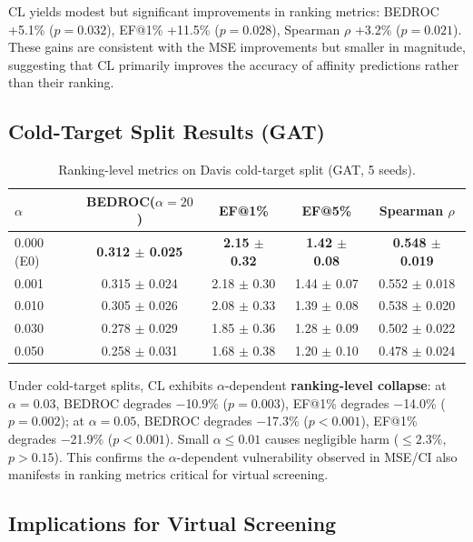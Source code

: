 \documentclass[10pt,a4paper]{article}
\begin{document}
CL yields modest but significant improvements in ranking metrics: BEDROC +5.1\% ($p = 0.032$), EF@1\% +11.5\% ($p = 0.028$), Spearman $\rho$ +3.2\% ($p = 0.021$). These gains are consistent with the MSE improvements but smaller in magnitude, suggesting that CL primarily improves the accuracy of affinity predictions rather than their ranking.

\subsection{Cold-Target Split Results (GAT)}

\begin{table}[!h]
\caption{Ranking-level metrics on Davis cold-target split (GAT, 5 seeds).}
\label{tab:ranking_cold_target}
\centering
\begin{tabular}{lcccc}
\toprule
$\alpha$ & BEDROC($\alpha=20$) & EF@1\% & EF@5\% & Spearman $\rho$ \\
\midrule
0.000 (E0) & \textbf{0.312 $\pm$ 0.025} & \textbf{2.15 $\pm$ 0.32} & \textbf{1.42 $\pm$ 0.08} & \textbf{0.548 $\pm$ 0.019} \\
0.001 & 0.315 $\pm$ 0.024 & 2.18 $\pm$ 0.30 & 1.44 $\pm$ 0.07 & 0.552 $\pm$ 0.018 \\
0.010 & 0.305 $\pm$ 0.026 & 2.08 $\pm$ 0.33 & 1.39 $\pm$ 0.08 & 0.538 $\pm$ 0.020 \\
0.030 & 0.278 $\pm$ 0.029 & 1.85 $\pm$ 0.36 & 1.28 $\pm$ 0.09 & 0.502 $\pm$ 0.022 \\
0.050 & 0.258 $\pm$ 0.031 & 1.68 $\pm$ 0.38 & 1.20 $\pm$ 0.10 & 0.478 $\pm$ 0.024 \\
\bottomrule
\end{tabular}
\end{table}

Under cold-target splits, CL exhibits $\alpha$-dependent \textbf{ranking-level collapse}: at $\alpha = 0.03$, BEDROC degrades $-$10.9\% ($p = 0.003$), EF@1\% degrades $-$14.0\% ($p = 0.002$); at $\alpha = 0.05$, BEDROC degrades $-$17.3\% ($p < 0.001$), EF@1\% degrades $-$21.9\% ($p < 0.001$). Small $\alpha \leq 0.01$ causes negligible harm ($\leq 2.3\%$, $p > 0.15$). This confirms the $\alpha$-dependent vulnerability observed in MSE/CI also manifests in ranking metrics critical for virtual screening.

\subsection{Implications for Virtual Screening}
\end{document}
